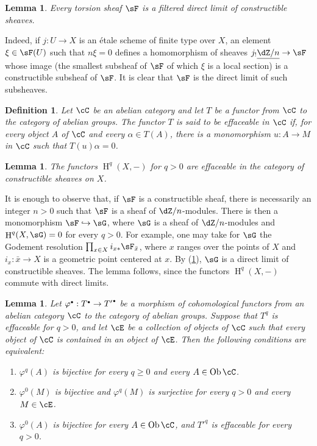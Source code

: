 \documentclass[12pt,oneside,english]{smfbook}
\DeclareMathOperator{\h}{H}
\DeclareMathOperator{\ob}{Ob}
\newcommand{\const}[1]{\underline{#1}}
\newtheorem{definition}[subsubsection]{Definition}
\newtheorem{lemma}[subsubsection]{Lemma}
\let\oldbullet\bullet
\renewcommand{\bullet}{\textnormal{\tiny$\oldbullet$}}
\begin{document}
\begin{lemma}\label{I:4-3-3}
Every torsion sheaf $\sF$ is a filtered direct limit of constructible sheaves.
\end{lemma}

Indeed, if $j:U\to X$ is an étale scheme of finite type over $X$, an element $\xi\in\sF(U)$ such that $n\xi=0$ defines a homomorphism of sheaves $j_!\const{\dZ/n}\to\sF$ whose image (the smallest subsheaf of $\sF$ of which $\xi$ is a local section) is a constructible subsheaf of $\sF$. It is clear that $\sF$ is the direct limit of such subsheaves.

\begin{definition}\label{I:4-3-4}
Let $\cC$ be an abelian category and let $T$ be a functor from $\cC$ to the category of abelian groups. The functor $T$ is said to be \emph{effaceable} in $\cC$ if, for every object $A$ of $\cC$ and every $\alpha\in T(A)$, there is a monomorphism $u:A\to M$ in $\cC$ such that $T(u)\alpha=0$.
\end{definition}

\begin{lemma}\label{I:4-3-5}
The functors $\h^q(X,-)$ for $q>0$ are effaceable in the category of constructible sheaves on $X$.
\end{lemma}

It is enough to observe that, if $\sF$ is a constructible sheaf, there is necessarily an integer $n>0$ such that $\sF$ is a sheaf of $\dZ/n$-modules. There is then a monomorphism $\sF\hookrightarrow\sG$, where $\sG$ is a sheaf of $\dZ/n$-modules and $\h^q(X,\sG)=0$ for every $q>0$. For example, one may take for $\sG$ the Godement resolution $\prod_{x\in X}i_{x*}\sF_{\bar x}$, where $x$ ranges over the points of $X$ and $i_x:\bar x\to X$ is a geometric point centered at $x$. By (\ref{I:4-3-3}), $\sG$ is a direct limit of constructible sheaves. The lemma follows, since the functors $\h^q(X,-)$ commute with direct limits.

\begin{lemma}\label{I:4-3-6}
Let $\varphi^\bullet:T^\bullet\to{T'}^\bullet$ be a morphism of cohomological functors from an abelian category $\cC$ to the category of abelian groups. Suppose that $T^q$ is effaceable for $q>0$, and let $\cE$ be a collection of objects of $\cC$ such that every object of $\cC$ is contained in an object of $\cE$. Then the following conditions are equivalent:
\begin{enumerate}[\indent (i)]
  \item $\varphi^q(A)$ is bijective for every $q\geqslant0$ and every $A\in\ob\cC$.
  \item $\varphi^0(M)$ is bijective and $\varphi^q(M)$ is surjective for every $q>0$ and every $M\in\cE$.
  \item $\varphi^0(A)$ is bijective for every $A\in\ob\cC$, and ${T'}^q$ is effaceable for every $q>0$.
\end{enumerate}
\end{lemma}
\end{document}
